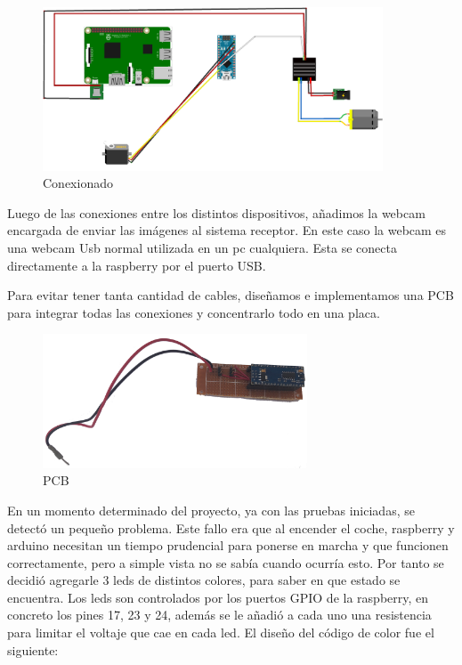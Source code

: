 \documentclass{pclass}
\begin{document}
\begin{itemize}
\begin{figure}[H]
	\centering
	\includegraphics[width=0.9\textwidth]{img/conexionado}
	\caption{Conexionado}
	\label{fig:conexionado}
\end{figure}

Luego de las conexiones entre los distintos dispositivos, añadimos la webcam encargada de enviar las imágenes al sistema receptor. En este caso la webcam es una webcam Usb normal utilizada en un pc cualquiera. Esta se conecta directamente a la raspberry por el puerto USB. 

Para evitar tener tanta cantidad de cables, diseñamos e implementamos una PCB para integrar todas las conexiones y concentrarlo todo en una placa.

\begin{figure}[H]
	\centering
	\includegraphics[width=0.7\textwidth]{img/pcb}
	\caption{PCB}
	\label{fig:pcb}
\end{figure}

En un momento determinado del proyecto, ya con las pruebas iniciadas, se detectó un pequeño problema. Este fallo era que al encender el coche, raspberry y arduino necesitan un tiempo prudencial para ponerse en marcha y que funcionen correctamente, pero a simple vista no se sabía cuando ocurría esto. Por tanto se decidió agregarle 3 leds de distintos colores, para saber en que estado se encuentra. Los leds son controlados por los puertos GPIO de la raspberry, en concreto los pines 17, 23 y 24, además se le añadió a cada uno una resistencia para limitar el voltaje que cae en cada led. El diseño del código de color fue el siguiente:


\end{itemize}
\end{document}
